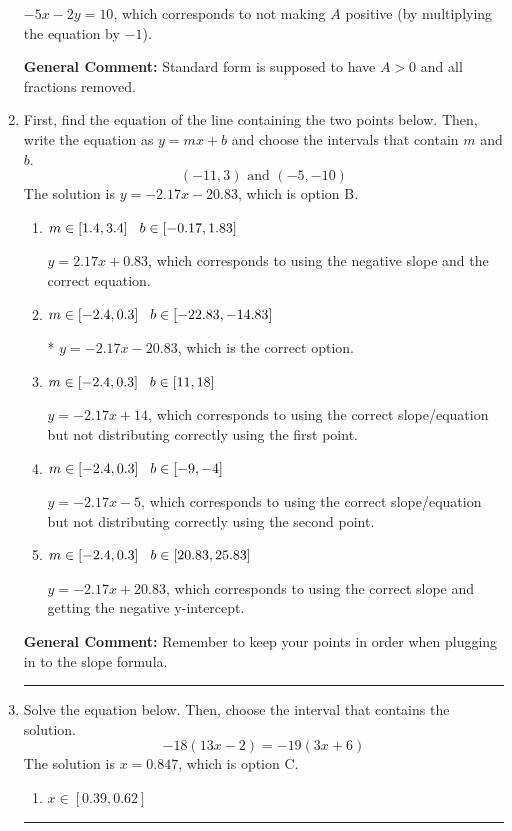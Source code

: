 \documentclass{extbook}[14pt]
\newcommand{\litem}[1]{\item #1

\rule{\textwidth}{0.4pt}}
\begin{document}
\begin{enumerate}
{\begin{enumerate}[label=\Alph*.]
 $-5x - 2y = 10$, which corresponds to not making $A$ positive (by multiplying the equation by $-1$).
\end{enumerate}

\textbf{General Comment:} Standard form is supposed to have $A > 0$ and all fractions removed.
}
\litem{
First, find the equation of the line containing the two points below. Then, write the equation as $ y=mx+b $ and choose the intervals that contain $m$ and $b$.
\[ (-11, 3) \text{ and } (-5, -10) \]The solution is \( y = -2.17x -20.83 \), which is option B.\begin{enumerate}[label=\Alph*.]
\item \( m \in [1.4, 3.4] \hspace*{3mm} b \in [-0.17, 1.83] \)

 $y = 2.17x + 0.83$, which corresponds to using the negative slope and the correct equation.
\item \( m \in [-2.4, 0.3] \hspace*{3mm} b \in [-22.83, -14.83] \)

* $y = -2.17x -20.83$, which is the correct option.
\item \( m \in [-2.4, 0.3] \hspace*{3mm} b \in [11, 18] \)

 $y = -2.17x + 14$, which corresponds to using the correct slope/equation but not distributing correctly using the first point.
\item \( m \in [-2.4, 0.3] \hspace*{3mm} b \in [-9, -4] \)

 $y = -2.17x -5$, which corresponds to using the correct slope/equation but not distributing correctly using the second point.
\item \( m \in [-2.4, 0.3] \hspace*{3mm} b \in [20.83, 25.83] \)

 $y = -2.17x + 20.83$, which corresponds to using the correct slope and getting the negative y-intercept.
\end{enumerate}

\textbf{General Comment:} Remember to keep your points in order when plugging in to the slope formula.
}
\litem{
Solve the equation below. Then, choose the interval that contains the solution.
\[ -18(13x -2) = -19(3x + 6) \]The solution is \( x = 0.847 \), which is option C.\begin{enumerate}[label=\Alph*.]
\item \( x \in [0.39, 0.62] \)


\end{enumerate}}
\end{enumerate}
\end{document}
